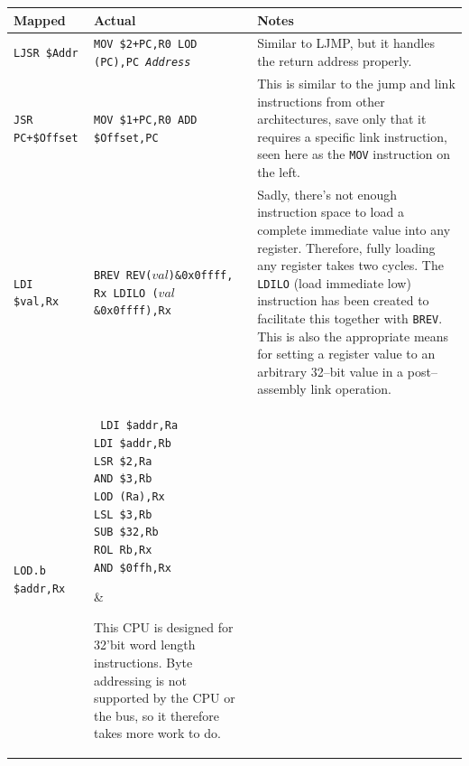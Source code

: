 \documentclass{gqtekspec}
\begin{document}
\begin{table}\begin{center}
\begin{tabular}{p{1.1in}p{1.8in}p{3in}}\\\hline
Mapped & Actual  & Notes \\\hline
{\tt LJSR \$Addr  }
	& \parbox[t]{1.5in}{\tt MOV \$2+PC,R0 \\ LOD (PC),PC \\ {\em Address}}
	& Similar to LJMP, but it handles the return address properly.
	\\\hline
{\tt JSR PC+\$Offset  }
	& \parbox[t]{1.5in}{\tt MOV \$1+PC,R0 \\ ADD \$Offset,PC}
	& This is similar to the jump and link instructions from other
	architectures, save only that it requires a specific link
	instruction, seen here as the {\tt MOV} instruction on the
	left.\\\hline
{\tt LDI \$val,Rx }
	& \parbox[t]{1.8in}{\tt BREV REV($val$)\&0x0ffff, Rx \\
			LDILO ($val$\&0x0ffff),Rx}
	& \parbox[t]{3.0in}{Sadly, there's not enough instruction
		space to load a complete immediate value into any register.
		Therefore, fully loading any register takes two cycles.
		The {\tt LDILO} (load immediate low) instruction has been
		created to facilitate this together with {\tt BREV}.
		\\
	This is also the appropriate means for setting a register value
	to an arbitrary 32--bit value in a post--assembly link
	operation.}\\\hline
{\tt LOD.b \$addr,Rx}
	& \parbox[t]{1.5in}{\tt %
	LDI	\$addr,Ra \\
	LDI	\$addr,Rb \\
	LSR	\$2,Ra \\
	AND	\$3,Rb \\
	LOD	(Ra),Rx \\
	LSL	\$3,Rb \\
	SUB	\$32,Rb \\
	ROL	Rb,Rx \\
	AND \$0ffh,Rx}
	& \parbox[t]{3in}{This CPU is designed for 32'bit word
	length instructions.  Byte addressing is not supported by the CPU or
	the bus, so it therefore takes more work to do. 

}
\end{tabular}
\end{center}
\end{table}
\end{document}
